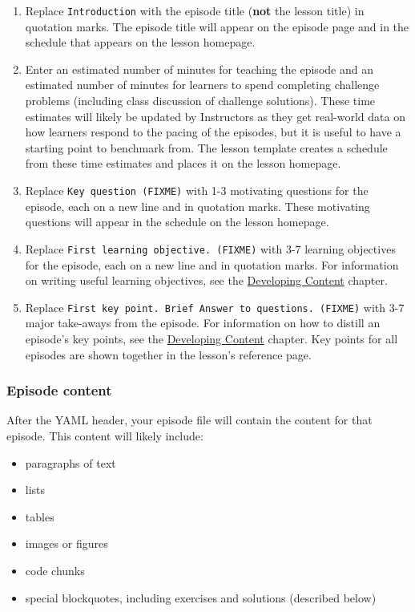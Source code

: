 \documentclass[
]{book}
\providecommand{\tightlist}{%
  \setlength{\itemsep}{0pt}\setlength{\parskip}{0pt}}
\begin{document}
\begin{enumerate}
\def\labelenumi{\arabic{enumi}.}
\tightlist
\item
  Replace \texttt{Introduction} with the episode title (\textbf{not} the lesson title) in quotation marks. The episode
  title will appear on the episode page and in the schedule that appears on the lesson homepage.
\item
  Enter an estimated number of minutes for teaching the episode and an estimated number of minutes for learners to spend completing challenge problems (including class discussion of challenge solutions). These time estimates
  will likely be updated by Instructors as they get real-world data on how learners respond to the pacing of
  the episodes, but it is useful to have a starting point to benchmark from. The lesson template creates a schedule
  from these time estimates and places it on the lesson homepage.
\item
  Replace \texttt{Key\ question\ (FIXME)} with 1-3 motivating questions for the episode, each on a new line and in quotation marks. These motivating questions will appear in the schedule on the lesson homepage.
\item
  Replace \texttt{First\ learning\ objective.\ (FIXME)} with 3-7 learning objectives for the episode, each on a new line and in quotation marks. For information on writing useful learning objectives, see the \href{https://carpentries.github.io/curriculum-development/developing-content.html}{Developing Content} chapter.
\item
  Replace \texttt{First\ key\ point.\ Brief\ Answer\ to\ questions.\ (FIXME)} with 3-7 major take-aways from the episode. For
  information on how to distill an episode's key points, see the \href{https://carpentries.github.io/curriculum-development/developing-content.html}{Developing Content} chapter. Key points for all episodes are shown
  together in the lesson's reference page.
\end{enumerate}

\hypertarget{episode-content}{%
\subsubsection{Episode content}\label{episode-content}}

After the YAML header, your episode file will contain the content for that episode. This content will likely
include:

\begin{itemize}
\tightlist
\item
  paragraphs of text
\item
  lists
\item
  tables
\item
  images or figures
\item
  code chunks
\item
  special blockquotes, including exercises and solutions (described below)
\end{itemize}
\end{document}
